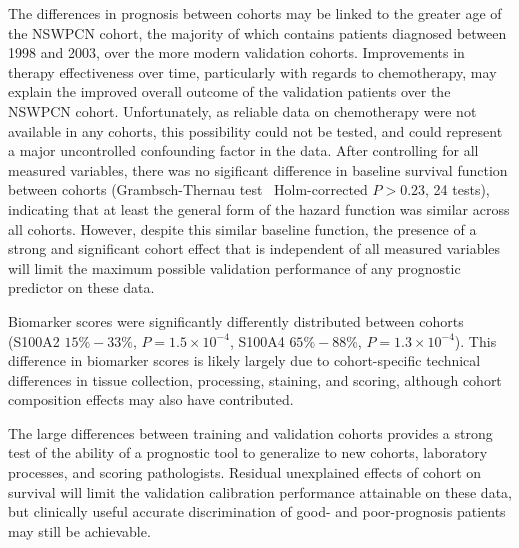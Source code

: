 \documentclass[dissertation.tex]{subfiles}
\begin{document}
The differences in prognosis between cohorts may be linked to the greater age of the \gls{NSWPCN} cohort, the majority of which contains patients diagnosed between 1998 and 2003, over the more modern validation cohorts.  Improvements in therapy effectiveness over time, particularly with regards to chemotherapy, may explain the improved overall outcome of the validation patients over the \gls{NSWPCN} cohort.  Unfortunately, as reliable data on chemotherapy were not available in any cohorts, this possibility could not be tested, and could represent a major uncontrolled confounding factor in the data.  After controlling for all measured variables, there was no sigificant difference in baseline survival function between cohorts (Grambsch-Thernau test~\cite{Grambsch1994} Holm-corrected $P > 0.23$, 24 tests), indicating that at least the general form of the hazard function was similar across all cohorts.  However, despite this similar baseline function, the presence of a strong and significant cohort effect that is independent of all measured variables will limit the maximum possible validation performance of any prognostic predictor on these data.

Biomarker scores were significantly differently distributed between cohorts (S100A2 $15\%-33\%$, $P = 1.5 \times 10^{-4}$, S100A4 $65\%-88\%$, $P = 1.3 \times 10^{-4}$).  This difference in biomarker scores is likely largely due to cohort-specific technical differences in tissue collection, processing, staining, and scoring, although cohort composition effects may also have contributed.

The large differences between training and validation cohorts provides a strong test of the ability of a prognostic tool to generalize to new cohorts, laboratory processes, and scoring pathologists.  Residual unexplained effects of cohort on survival will limit the validation calibration performance attainable on these data, but clinically useful accurate discrimination of good- and poor-prognosis patients may still be achievable.
\end{document}
